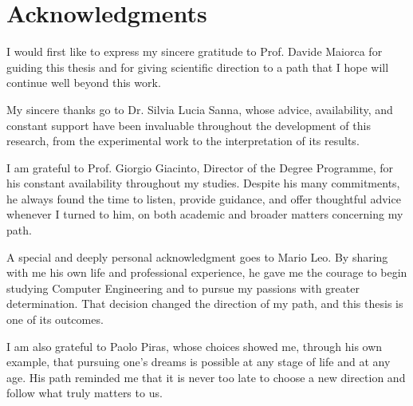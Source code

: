 \cleardoublepage
\chapter*{Acknowledgments}

I would first like to express my sincere gratitude to Prof. Davide Maiorca for guiding this thesis and for giving scientific direction to a path that I hope will continue well beyond this work.

My sincere thanks go to Dr. Silvia Lucia Sanna, whose advice, availability, and constant support have been invaluable throughout the development of this research, from the experimental work to the interpretation of its results.

I am grateful to Prof. Giorgio Giacinto, Director of the Degree Programme, for his constant availability throughout my studies. Despite his many commitments, he always found the time to listen, provide guidance, and offer thoughtful advice whenever I turned to him, on both academic and broader matters concerning my path.

A special and deeply personal acknowledgment goes to Mario Leo. By sharing with me his own life and professional experience, he gave me the courage to begin studying Computer Engineering and to pursue my passions with greater determination. That decision changed the direction of my path, and this thesis is one of its outcomes.

I am also grateful to Paolo Piras, whose choices showed me, through his own example, that pursuing one's dreams is possible at any stage of life and at any age. His path reminded me that it is never too late to choose a new direction and follow what truly matters to us.

\cleardoublepage

